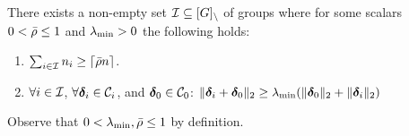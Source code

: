 

\begin{definition}  \label{incodef}
	There exists a non-empty set ${\cal I}\subseteq [G]_\setminus$ of groups where for some scalars $0 < \bar{\rho}\leq 1$ and $\lambda_{\min}>0$ the following holds:
	\begin{enumerate}
		\item $\sum_{i\in {\cal I}} n_i\geq \lceil \bar{\rho} n\rceil$.
		\item $\forall i \in {\cal I}$, $\forall \boldsymbol{\delta}_i \in {\cal C}_i$, and $\boldsymbol{\delta}_0\in{\cal C}_0$: $\|\boldsymbol{\delta}_i+\boldsymbol{\delta}_0\|_{2}\geq \lambda_{\min} (\|\boldsymbol{\delta}_0\|_{2}+\|\boldsymbol{\delta}_i\|_{2})$
	\end{enumerate}
	Observe that $0 < \lambda_{\min},\bar{\rho}\leq 1$ by definition.
\end{definition}




